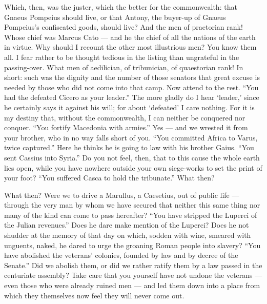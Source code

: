  Which, then, was the juster, which the better for the commonwealth: that Gnaeus Pompeius should live, or that Antony, the buyer-up of Gnaeus Pompeius's confiscated goods, should live? And the men of praetorian rank! Whose chief was Marcus Cato --- and he the chief of all the nations of the earth in virtue. Why should I recount the other most illustrious men? You know them all. I fear rather to be thought tedious in the listing than ungrateful in the passing-over. What men of aedilician, of tribunician, of quaestorian rank! In short: such was the dignity and the number of those senators that great excuse is needed by those who did not come into that camp. Now attend to the rest. ``You had the defeated Cicero as your leader.'' The more gladly do I hear `leader,' since he certainly says it against his will; for about `defeated' I care nothing. For it is my destiny that, without the commonwealth, I can neither be conquered nor conquer. ``You fortify Macedonia with armies.'' Yes --- and we wrested it from your brother, who in no way falls short of you. ``You committed Africa to Varus, twice captured.'' Here he thinks he is going to law with his brother Gaius. ``You sent Cassius into Syria.'' Do you not feel, then, that to this cause the whole earth lies open, while you have nowhere outside your own siege-works to set the print of your foot? ``You suffered Casca to hold the tribunate.'' What then?

 What then? Were we to drive a Marullus, a Caesetius, out of public life --- through the very man by whom we have secured that neither this same thing nor many of the kind can come to pass hereafter? ``You have stripped the Luperci of the Julian revenues.'' Does he dare make mention of the Luperci? Does he not shudder at the memory of that day on which, sodden with wine, smeared with unguents, naked, he dared to urge the groaning Roman people into slavery? ``You have abolished the veterans' colonies, founded by law and by decree of the Senate.'' Did we abolish them, or did we rather ratify them by a law passed in the centuriate assembly? Take care that you yourself have not undone the veterans --- even those who were already ruined men --- and led them down into a place from which they themselves now feel they will never come out.

